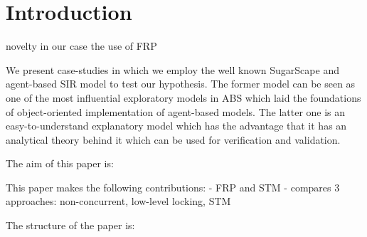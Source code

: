 \section{Introduction}
novelty in our case the use of FRP

We present case-studies in which we employ the well known SugarScape \citep{epstein_growing_1996} and agent-based SIR \citep{macal_agent-based_2010} model to test our hypothesis. The former model can be seen as one of the most influential exploratory models in ABS which laid the foundations of object-oriented implementation of agent-based models. The latter one is an easy-to-understand explanatory model which has the advantage that it has an analytical theory behind it which can be used for verification and validation.

The aim of this paper is: 

This paper makes the following contributions:
- FRP and STM
- compares 3 approaches: non-concurrent, low-level locking, STM

The structure of the paper is: